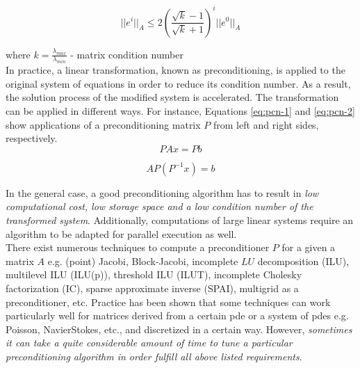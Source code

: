 \begin{equation} \label{eq:Gmres-7}
	|| e^i ||_A \leq 2 ( \frac{\sqrt k - 1}{\sqrt k + 1} )^i || e^0 ||_A
\end{equation}

where $k = \frac{\lambda_{max}}{\lambda_{min}}$ - matrix condition number\\


In practice, a linear transformation, known as preconditioning, is applied to the original system of equations in order
to reduce its condition number. As a result, the solution process of the modified system is accelerated. The
transformation can be applied in different ways. For instance, Equations \ref{eq:pcn-1} and \ref{eq:pcn-2} show applications of a preconditioning matrix $P$ from left and right sides, respectively.\\


\begin{equation} \label{eq:pcn-1}
	PAx = Pb
\end{equation}


\begin{equation} \label{eq:pcn-2}
	AP(P^{-1}x) = b
\end{equation}


In the general case, a good preconditioning algorithm has to result in \textit{low computational cost, low storage space and a low condition number of the transformed system}. Additionally, computations of large linear systems require an algorithm to be adapted for parallel execution as well.\\


There exist numerous techniques to compute a preconditioner $P$ for a given a matrix $A$ e.g. (point) Jacobi, Block-Jacobi, incomplete $LU$ decomposition (ILU), multilevel ILU (ILU(p)), threshold ILU (ILUT), incomplete Cholesky factorization (IC), sparse approximate inverse (SPAI), multigrid as a preconditioner, etc. Practice has been shown that some techniques can work particularly well for matrices derived from a certain \acrshort{pde} or a system of \acrshort{pde}s e.g. Poisson, Navier\-Stokes, etc., and discretized in a certain way. However, \textit{sometimes it can take a quite considerable amount of time to tune a particular preconditioning algorithm in order fulfill all above listed requirements}.\\


